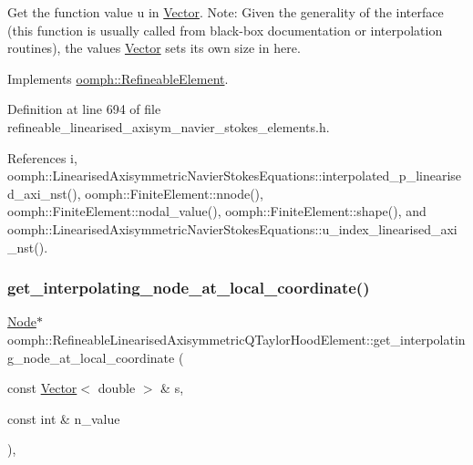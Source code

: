 Get the function value u in \hyperlink{classoomph_1_1Vector}{Vector}. Note\+: Given the generality of the interface (this function is usually called from black-\/box documentation or interpolation routines), the values \hyperlink{classoomph_1_1Vector}{Vector} sets its own size in here. 



Implements \hyperlink{classoomph_1_1RefineableElement_ada6f0efe831ffefb1d2829ce01d45bfc}{oomph\+::\+Refineable\+Element}.



Definition at line 694 of file refineable\+\_\+linearised\+\_\+axisym\+\_\+navier\+\_\+stokes\+\_\+elements.\+h.



References i, oomph\+::\+Linearised\+Axisymmetric\+Navier\+Stokes\+Equations\+::interpolated\+\_\+p\+\_\+linearised\+\_\+axi\+\_\+nst(), oomph\+::\+Finite\+Element\+::nnode(), oomph\+::\+Finite\+Element\+::nodal\+\_\+value(), oomph\+::\+Finite\+Element\+::shape(), and oomph\+::\+Linearised\+Axisymmetric\+Navier\+Stokes\+Equations\+::u\+\_\+index\+\_\+linearised\+\_\+axi\+\_\+nst().

\mbox{\label{classoomph_1_1RefineableLinearisedAxisymmetricQTaylorHoodElement_a198ab2e61e5ac1b79e46fcd4d3f29a3c}} 
\subsubsection{\texorpdfstring{get\+\_\+interpolating\+\_\+node\+\_\+at\+\_\+local\+\_\+coordinate()}{get\_interpolating\_node\_at\_local\_coordinate()}}
{\footnotesize\ttfamily \hyperlink{classoomph_1_1Node}{Node}$\ast$ oomph\+::\+Refineable\+Linearised\+Axisymmetric\+Q\+Taylor\+Hood\+Element\+::get\+\_\+interpolating\+\_\+node\+\_\+at\+\_\+local\+\_\+coordinate (\begin{DoxyParamCaption}\item[{const \hyperlink{classoomph_1_1Vector}{Vector}$<$ double $>$ \&}]{s,  }\item[{const int \&}]{n\+\_\+value }\end{DoxyParamCaption})\hspace{0.3cm}{\ttfamily [inline]}, {\ttfamily [virtual]}}



